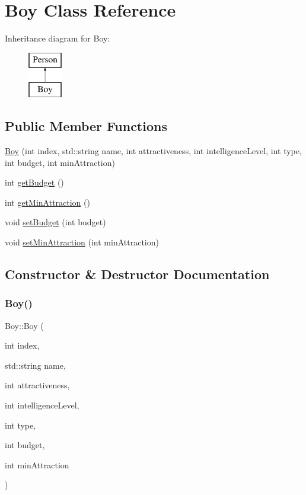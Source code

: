\hypertarget{class_boy}{}\section{Boy Class Reference}
\label{class_boy}
Inheritance diagram for Boy\+:\begin{figure}[H]
\begin{center}
\leavevmode
\includegraphics[height=2.000000cm]{class_boy}
\end{center}
\end{figure}
\subsection*{Public Member Functions}
\begin{DoxyCompactItemize}
\item 
\hyperlink{class_boy_aeec834216c56126cf90e48dc4c4843cb}{Boy} (int index, std\+::string name, int attractiveness, int intelligence\+Level, int type, int budget, int min\+Attraction)
\item 
int \hyperlink{class_boy_a05c48b12091ebcad44ba86ba88514ac5}{get\+Budget} ()
\item 
int \hyperlink{class_boy_a35d84533352a88f6365a28ba21b9f993}{get\+Min\+Attraction} ()
\item 
void \hyperlink{class_boy_adb0aa7b4399c4d463129be2b2b9c3b42}{set\+Budget} (int budget)
\item 
void \hyperlink{class_boy_a9e39b3cb4cbc2c0827a34410d9f826fc}{set\+Min\+Attraction} (int min\+Attraction)
\end{DoxyCompactItemize}


\subsection{Constructor \& Destructor Documentation}
\mbox{\label{class_boy_aeec834216c56126cf90e48dc4c4843cb}} 
\subsubsection{\texorpdfstring{Boy()}{Boy()}}
{\footnotesize\ttfamily Boy\+::\+Boy (\begin{DoxyParamCaption}\item[{int}]{index,  }\item[{std\+::string}]{name,  }\item[{int}]{attractiveness,  }\item[{int}]{intelligence\+Level,  }\item[{int}]{type,  }\item[{int}]{budget,  }\item[{int}]{min\+Attraction }\end{DoxyParamCaption})}

